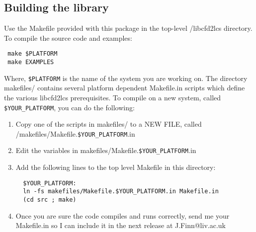 \documentclass[a4paper,12pt]{article}
\begin{document}
\subsection*{Building the library}
Use the Makefile provided with this package in the top-level /libcfd2lcs directory.  To compile the source code and examples:
\begin{verbatim}
 make $PLATFORM
 make EXAMPLES
\end{verbatim}
Where, \verb|$PLATFORM| is the name of the system you are working on. The directory makefiles/ contains several platform dependent Makefile.in scripts which define the various libcfd2lcs prerequisites.  To compile on a new system, called \verb|$YOUR_PLATFORM|, you can do the following: 
\begin{enumerate}
 \item Copy one of the scripts in makefiles/ to a NEW FILE, called\\ /makefiles/Makefile.\verb|$YOUR_PLATFORM|.in
 \item Edit the variables in makefiles/Makefile.\verb|$YOUR_PLATFORM|.in
 \item Add the following lines to the top level Makefile in this directory:
 \begin{verbatim}
  $YOUR_PLATFORM:
  ln -fs makefiles/Makefile.$YOUR_PLATFORM.in Makefile.in
  (cd src ; make)
 \end{verbatim} 
 \item Once you are sure the code compiles and runs correctly, send me your Makefile.in so I can include it in the next release at J.Finn@liv.ac.uk
\end{enumerate}
\end{document}

